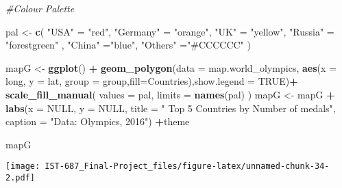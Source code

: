 \documentclass[]{article}
\newenvironment{Shaded}{\begin{snugshade}}{\end{snugshade}}
\newcommand{\CommentTok}[1]{\textcolor[rgb]{0.56,0.35,0.01}{\textit{#1}}}
\newcommand{\DataTypeTok}[1]{\textcolor[rgb]{0.13,0.29,0.53}{#1}}
\newcommand{\KeywordTok}[1]{\textcolor[rgb]{0.13,0.29,0.53}{\textbf{#1}}}
\newcommand{\NormalTok}[1]{#1}
\newcommand{\OperatorTok}[1]{\textcolor[rgb]{0.81,0.36,0.00}{\textbf{#1}}}
\newcommand{\OtherTok}[1]{\textcolor[rgb]{0.56,0.35,0.01}{#1}}
\newcommand{\StringTok}[1]{\textcolor[rgb]{0.31,0.60,0.02}{#1}}
\begin{document}
\begin{Shaded}
\begin{Highlighting}[]
\CommentTok{#Colour Palette}

\NormalTok{pal <-}\StringTok{ }\KeywordTok{c}\NormalTok{(}
  \StringTok{"USA"}\NormalTok{ =}\StringTok{ "red"}\NormalTok{,}
  \StringTok{"Germany"}\NormalTok{ =}\StringTok{ "orange"}\NormalTok{, }
  \StringTok{"UK"}\NormalTok{ =}\StringTok{ "yellow"}\NormalTok{, }
  \StringTok{"Russia"}\NormalTok{ =}\StringTok{ "forestgreen"}\NormalTok{ ,}
  \StringTok{"China"}\NormalTok{ =}\StringTok{"blue"}\NormalTok{,}
  \StringTok{"Others"}\NormalTok{ =}\StringTok{"#CCCCCC"}
\NormalTok{)}

\NormalTok{mapG <-}\StringTok{ }\KeywordTok{ggplot}\NormalTok{() }\OperatorTok{+}\StringTok{ }\KeywordTok{geom_polygon}\NormalTok{(}\DataTypeTok{data =}\NormalTok{ map.world_olympics, }\KeywordTok{aes}\NormalTok{(}\DataTypeTok{x =}\NormalTok{ long, }\DataTypeTok{y =}\NormalTok{ lat, }\DataTypeTok{group =}\NormalTok{ group,}\DataTypeTok{fill=}\NormalTok{Countries),}\DataTypeTok{show.legend =} \OtherTok{TRUE}\NormalTok{)}\OperatorTok{+}\StringTok{ }\KeywordTok{scale_fill_manual}\NormalTok{(}
    \DataTypeTok{values =}\NormalTok{ pal,}
    \DataTypeTok{limits =} \KeywordTok{names}\NormalTok{(pal)}
\NormalTok{  )}
\NormalTok{mapG <-}\StringTok{ }\NormalTok{mapG }\OperatorTok{+}\StringTok{  }
\StringTok{                 }\KeywordTok{labs}\NormalTok{(}\DataTypeTok{x =} \OtherTok{NULL}\NormalTok{, }
                  \DataTypeTok{y =} \OtherTok{NULL}\NormalTok{, }
                  \DataTypeTok{title =} \StringTok{" Top 5 Countries by Number of medals"}\NormalTok{, }
                  \DataTypeTok{caption =} \StringTok{"Data: Olympics, 2016"}\NormalTok{) }\OperatorTok{+}\NormalTok{theme }

\NormalTok{mapG}
\end{Highlighting}
\end{Shaded}

\texttt{[image: IST-687\_Final-Project\_files/figure-latex/unnamed-chunk-34-2.pdf]}
\end{document}
